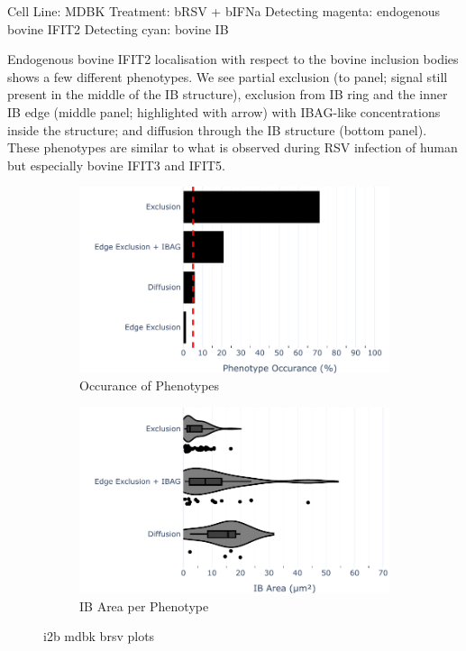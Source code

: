 Cell Line: MDBK \newline
Treatment: bRSV + bIFNa \newline
Detecting magenta: endogenous bovine IFIT2  \newline
Detecting cyan: bovine IB \newline

Endogenous bovine IFIT2 localisation with respect to the bovine inclusion bodies shows a few different phenotypes. We see partial exclusion (to panel; signal still present in the middle of the IB structure), exclusion from IB ring and the inner IB edge (middle panel; highlighted with arrow) with IBAG-like concentrations inside the structure; and diffusion through the IB structure (bottom panel). These phenotypes are similar to what is observed during RSV infection of human but especially bovine IFIT3 and IFIT5.

\begin{figure}
    \begin{subfigure}{0.5\textwidth}
    \includegraphics[width=1\linewidth]{10. Chapter 5/Figs/01. Infection/02. IFIT2B/10. bar_i2b_mdbk.pdf} 
    \caption[]{Occurance of Phenotypes}
    \end{subfigure}
    \begin{subfigure}{0.5\textwidth}
    \includegraphics[width=1\linewidth]{10. Chapter 5/Figs/01. Infection/02. IFIT2B/11. violin_i2b_mdbk.pdf}
    \caption[]{IB Area per Phenotype}
    \end{subfigure}
    \caption[i2b mdbk brsv plots]{i2b mdbk brsv plots}
    \label{fig:i2b mdbk brsv plots}
\end{figure}

